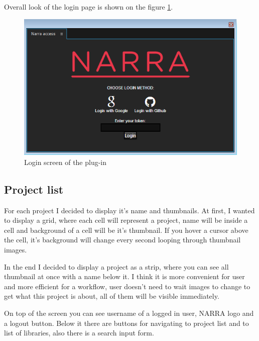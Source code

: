 \documentclass[thesis=B,english]{FITthesis}[2012/10/20]
\begin{document}
Overall look of the login page is shown on the figure \ref{fig:login}.
	\begin{figure}
		\centering
		\includegraphics[width=1\textwidth]{LoginPage.png}
		\caption{Login screen of the plug-in}\label{fig:login}
	\end{figure}
\subsection{Project list}
For each project I decided to display it's name and thumbnails. At first, I wanted to display a grid, where each cell will represent a project, name will be inside a cell and background of a cell will be it's thumbnail. If you hover a cursor above the cell, it's background will change every second looping through thumbnail images.

In the end I decided to display a project as a strip, where you can see all thumbnail at once with a name below it. I think it is more convenient for user and more efficient for a workflow, user doesn't need to wait images to change to get what this project is about, all of them will be visible immediately.

On top of the screen you can see username of a logged in user, NARRA logo and a logout button. Below it there are buttons for navigating to project list and to list of libraries, also there is a search input form.
\end{document}
